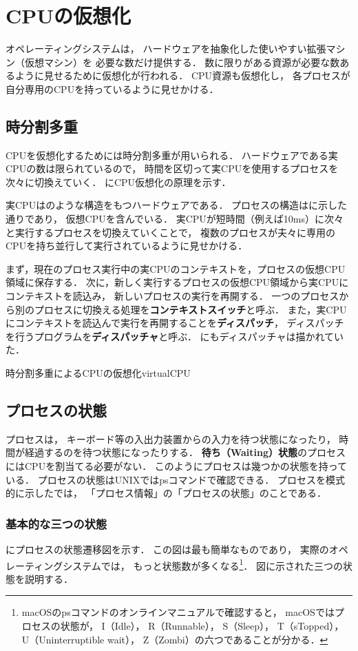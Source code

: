 \chapter{CPUの仮想化}
オペレーティングシステムは，
ハードウェアを抽象化した使いやすい拡張マシン（仮想マシン）を
必要な数だけ提供する．
数に限りがある資源が必要な数あるように見せるために仮想化が行われる．
CPU資源も仮想化し，
各プロセスが自分専用のCPUを持っているように見せかける．

\section{時分割多重}
CPUを仮想化するためには時分割多重が用いられる．
ハードウェアである実CPUの数は限られているので，
時間を区切って実CPUを使用するプロセスを次々に切換えていく．
にCPU仮想化の原理を示す．

実CPUはのような構造をもつハードウェアである．
プロセスの構造はに示した通りであり，
仮想CPUを含んでいる．
実CPUが短時間（例えば10ms）に次々と実行するプロセスを切換えていくことで，
複数のプロセスが夫々に専用のCPUを持ち並行して実行されているように見せかける．

まず，現在のプロセス実行中の実CPUのコンテキストを，プロセスの仮想CPU領域に保存する．
次に，新しく実行するプロセスの仮想CPU領域から実CPUにコンテキストを読込み，
新しいプロセスの実行を再開する．
一つのプロセスから別のプロセスに切換える処理を{\bf コンテキストスイッチ}と呼ぶ．
また，実CPUにコンテキストを読込んで実行を再開することを{\bf ディスパッチ}，
ディスパッチを行うプログラムを{\bf ディスパッチャ}と呼ぶ．
にもディスパッチャは描かれていた．

{時分割多重によるCPUの仮想化}{virtualCPU}

\section{プロセスの状態}
プロセスは，
キーボード等の入出力装置からの入力を待つ状態になったり，
時間が経過するのを待つ状態になったりする．
{\bf 待ち（Waiting）状態}のプロセスにはCPUを割当てる必要がない．
このようにプロセスは幾つかの状態を持っている．
プロセスの状態はUNIXではpsコマンドで確認できる．
プロセスを模式的に示したでは，
「プロセス情報」の「プロセスの状態」のことである．

\subsection{基本的な三つの状態}
にプロセスの状態遷移図を示す．
この図は最も簡単なものであり，
実際のオペレーティングシステムでは，
もっと状態数が多くなる\footnote{
macOSのpsコマンドのオンラインマニュアルで確認すると，
macOSではプロセスの状態が，
I（Idle），
R（Runnable），
S（Sleep），
T（sTopped），
U（Uninterruptible wait），
Z（Zombi）の六つであることが分かる．}．
図に示された三つの状態を説明する．

